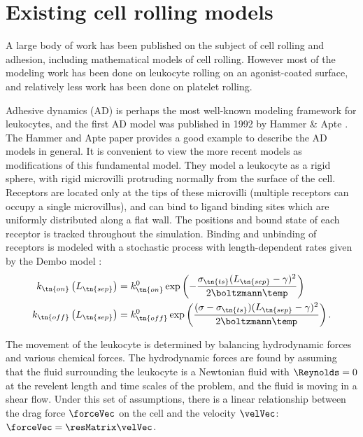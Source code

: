 \section{Existing cell rolling models}
\label{sec:exist-cell-roll}

A large body of work has been published on the subject of cell rolling
and adhesion, including mathematical models of cell rolling. However
most of the modeling work has been done on leukocyte rolling on an
agonist-coated surface, and relatively less work has been done on
platelet rolling.

Adhesive dynamics (AD) is perhaps the most well-known modeling
framework for leukocytes, and the first AD model was published in 1992
by Hammer \& Apte \cite{Hammer1992}. The Hammer and Apte paper
provides a good example to describe the AD models in general. It is
convenient to view the more recent models as modifications of this
fundamental model. They model a leukocyte as a rigid sphere, with
rigid microvilli protruding normally from the surface of the
cell. Receptors are located only at the tips of these microvilli
(multiple receptors can occupy a single microvillus), and can bind to
ligand binding sites which are uniformly distributed along a flat
wall. The positions and bound state of each receptor is tracked
throughout the simulation. Binding and unbinding of receptors is
modeled with a stochastic process with length-dependent rates given by
the Dembo model \cite{Dembo1988}:
\begin{align}
  \label{eq:dembo-on}
  k_\tn{on} \left(L_\tn{sep}\right)
  &= k_\tn{on}^0 \exp \left( -\frac{\sigma_\tn{ts} (L_\tn{sep} -
    \gamma)^2}{2\boltzmann \temp} \right) \\
  \label{eq:dembo-off}
  k_\tn{off} \left(L_\tn{sep}\right)
  &= k_\tn{off}^0 \exp \left( \frac{(\sigma - \sigma_\tn{ts})
    (L_\tn{sep} - \gamma)^2}{2 \boltzmann \temp} \right).
\end{align}

The movement of the leukocyte is determined by balancing hydrodynamic
forces and various chemical forces. The hydrodynamic forces are found
by assuming that the fluid surrounding the leukocyte is a Newtonian
fluid with $\Reynolds = 0$ at the revelent length and time scales of
the problem, and the fluid is moving in a shear flow. Under this set
of assumptions, there is a linear relationship between the drag force
$\forceVec$ on the cell and the velocity $\velVec$: $\forceVec =
\resMatrix \velVec$. 
